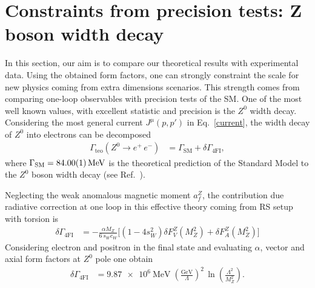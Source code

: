 \documentclass[twocolumn,showpacs,showkeys,prd,superscriptaddress]{revtex4-1}
\begin{document}
\section{\label{sec:constraints}Constraints from precision tests: Z boson width decay}

In this section, our aim is to compare our theoretical results with experimental data. Using the obtained form factors, one can strongly constraint the scale for new physics coming from extra dimensions scenarios. This strength comes from comparing one-loop observables with precision tests of the SM. One of the most well known values, with excellent statistic and precision is the $Z^0$ width decay. Considering the most general current $J^\mu(p,p')$ in Eq.~\eqref{current}, the width decay of $Z^0$ into electrons can be decomposed
\begin{align}
  \Gamma_{\text{teo}}\left(Z^0\rightarrow e^+\,e^-\right) &= \Gamma_{\text{SM}} + \delta\Gamma_{\text{4FI}} ,
\end{align}
where $\Gamma_{\text{SM}} = \SI{84.00 \pm 0.01}{\MeV}$ is the theoretical prediction of the Standard Model to the $Z^0$ boson width decay (see Ref.~\cite{Beringer:1900zz}).

Neglecting the weak anomalous magnetic moment $a_f^Z$, the contribution due radiative correction at one loop in this effective theory coming from RS setup with torsion is
\begin{align}
  \delta\Gamma_{\text{4FI}} &= -\frac{\alpha M_Z}{6\,s_Wc_W}\Bigg[(1 - 4s_W^2)\delta F_V^Z(M_Z^2) + \delta F_A^Z(M_Z^2)\Bigg]
\end{align}
Considering electron and positron in the final state and evaluating $\alpha$, vector and axial form factors at $Z^0$ pole one obtain 
\begin{align}
  \label{deltagammateo}
  \delta\Gamma_{\text{4FI}} &= \SI{9.87e6}{\MeV}\;\left(\frac{\si{\GeV}}{\Lambda}\right)^2\,\ln\left(\frac{\Lambda^2}{M_Z^2}\right).
\end{align}
\end{document}
